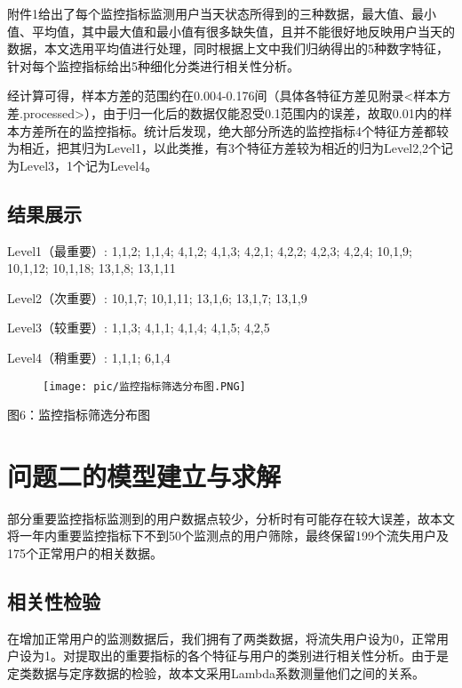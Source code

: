 \documentclass{ctexart}
\begin{document}
    附件1给出了每个监控指标监测用户当天状态所得到的三种数据，最大值、最小值、平均值，其中最大值和最小值有很多缺失值，且并不能很好地反映用户当天的数据，本文选用平均值进行处理，同时根据上文中我们归纳得出的5种数字特征，针对每个监控指标给出5种细化分类进行相关性分析。

    经计算可得，样本方差的范围约在0.004-0.176间（具体各特征方差见附录<样本方差.processed>），由于归一化后的数据仅能忍受0.1范围内的误差，故取0.01内的样本方差所在的监控指标。统计后发现，绝大部分所选的监控指标4个特征方差都较为相近，把其归为Level1，以此类推，有3个特征方差较为相近的归为Level2,2个记为Level3，1个记为Level4。


    \subsection{结果展示}

    Level1（最重要）: 1,1,2; 1,1,4; 4,1,2; 4,1,3; 4,2,1; 4,2,2; 4,2,3; 4,2,4; 10,1,9; 10,1,12; 10,1,18; 13,1,8; 13,1,11

    Level2（次重要）: 10,1,7; 10,1,11; 13,1,6; 13,1,7; 13,1,9

    Level3（较重要）: 1,1,3; 4,1,1; 4,1,4; 4,1,5; 4,2,5

    Level4（稍重要）: 1,1,1; 6,1,4

    \begin{center}
        \begin{figure}[H]
            \begin{center}
                \texttt{[image: pic/监控指标筛选分布图.PNG]}
            \end{center}
        \end{figure}
        图6：监控指标筛选分布图
    \end{center}
     
    \section{问题二的模型建立与求解}

    部分重要监控指标监测到的用户数据点较少，分析时有可能存在较大误差，故本文将一年内重要监控指标下不到50个监测点的用户筛除，最终保留199个流失用户及175个正常用户的相关数据。

    \subsection{相关性检验}

    在增加正常用户的监测数据后，我们拥有了两类数据，将流失用户设为0，正常用户设为1。对提取出的重要指标的各个特征与用户的类别进行相关性分析。由于是定类数据与定序数据的检验，故本文采用Lambda系数测量他们之间的关系。
\end{document}
